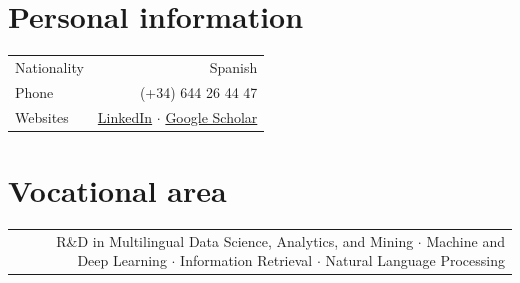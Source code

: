 \documentclass[10pt]{article}
\begin{document}
\section*{Personal information}
\begin{tabular}{L!{\VRule}R}
Nationality&Spanish\vspace{5pt}\\
Phone& (+34) 644 26 44 47 \vspace{5pt}\\
Websites& \href{https://www.linkedin.com/in/marfrasa/en/}{LinkedIn} $\cdot$ \href{http://scholar.google.com/citations?user=tjhy5T8AAAAJ}{Google Scholar} \\
\end{tabular}

\section*{Vocational area}
\begin{tabular}{L!{\VRule}R}
&R\&D in Multilingual Data Science, Analytics, and Mining $\cdot$ Machine and Deep Learning $\cdot$ Information Retrieval $\cdot$ Natural Language Processing \vspace{5pt}\\
\end{tabular}
\end{document}
